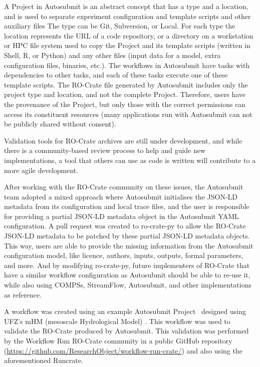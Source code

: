 \documentclass[10pt,letterpaper]{article}
\begin{document}
A Project in Autosubmit is an abstract concept that has a type and a location, and is used to separate experiment configuration and template scripts and other auxiliary files
The type can be Git, Subversion, or Local.
For each type the location represents the URL of a code repository, or a directory on a workstation or HPC file system used to copy the Project and its template scripts (written in Shell, R, or Python) and any other files (input data for a model, extra configuration files, binaries, etc.).
The workflows in Autosubmit have tasks with dependencies to other tasks, and each of these tasks execute one of these template scripts.
The RO-Crate file generated by Autosubmit includes only the project type and location, and not the complete Project.
Therefore, users have the provenance of the Project, but only those with the correct permissions can access its constituent resources (many applications run with Autosubmit can not be publicly shared without consent).

Validation tools for RO-Crate archives are still under development, and while there is a community-based review process to help and guide new implementations, a tool that others can use as code is written will contribute to a more agile development.

After working with the RO-Crate community on these issues, the Autosubmit team adopted a mixed approach where Autosubmit initialises the JSON-LD metadata from its configuration and local trace files, and the user is responsible for providing a partial JSON-LD metadata object in the Autosubmit YAML configuration.
A pull request was created to ro-crate-py to allow the RO-Crate JSON-LD metadata to be patched by these partial JSON-LD metadata objects.
This way, users are able to provide the missing information from the Autosubmit configuration model, like licence, authors, inputs, outputs, formal parameters, and more.
And by modifying ro-crate-py, future implementers of RO-Crate that have a similar workflow configuration as Autosubmit should be able to re-use it, while also using COMPSs, StreamFlow, Autosubmit, and other implementations as reference.

A workflow was created using an example Autosubmit Project~\cite{Kinoshita 2023} designed using UFZ's mHM (mesoscale Hydrological Model)
\cite{Samaniego 2010,Kumar 2013}. This workflow was used to validate the RO-Crate produced by Autosubmit.
This validation was performed by the Workflow Run RO-Crate community in a public GitHub repository (\url{https://github.com/ResearchObject/workflow-run-crate/}) and also using the aforementioned Runcrate.
\end{document}
